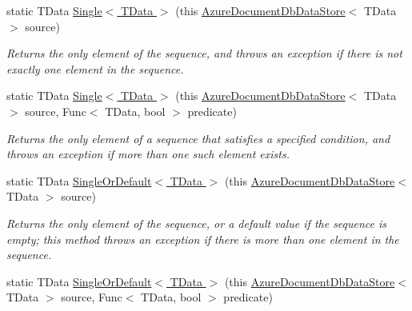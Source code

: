 \begin{DoxyCompactItemize}
\item 
static T\+Data \hyperlink{classSystem_1_1Linq_1_1AzureDocumentDbDataStoreExtensions_a0db5f545a8b606324451bfec69db7862_a0db5f545a8b606324451bfec69db7862}{Single$<$ T\+Data $>$} (this \hyperlink{classCqrs_1_1Azure_1_1DocumentDb_1_1DataStores_1_1AzureDocumentDbDataStore}{Azure\+Document\+Db\+Data\+Store}$<$ T\+Data $>$ source)
\begin{DoxyCompactList}\small\item\em Returns the only element of the sequence, and throws an exception if there is not exactly one element in the sequence. \end{DoxyCompactList}\item 
static T\+Data \hyperlink{classSystem_1_1Linq_1_1AzureDocumentDbDataStoreExtensions_a88615fafe8c7bb0f9a0804eb4e4f0472_a88615fafe8c7bb0f9a0804eb4e4f0472}{Single$<$ T\+Data $>$} (this \hyperlink{classCqrs_1_1Azure_1_1DocumentDb_1_1DataStores_1_1AzureDocumentDbDataStore}{Azure\+Document\+Db\+Data\+Store}$<$ T\+Data $>$ source, Func$<$ T\+Data, bool $>$ predicate)
\begin{DoxyCompactList}\small\item\em Returns the only element of a sequence that satisfies a specified condition, and throws an exception if more than one such element exists. \end{DoxyCompactList}\item 
static T\+Data \hyperlink{classSystem_1_1Linq_1_1AzureDocumentDbDataStoreExtensions_ab0724b844d77e86bee14ce246161b6be_ab0724b844d77e86bee14ce246161b6be}{Single\+Or\+Default$<$ T\+Data $>$} (this \hyperlink{classCqrs_1_1Azure_1_1DocumentDb_1_1DataStores_1_1AzureDocumentDbDataStore}{Azure\+Document\+Db\+Data\+Store}$<$ T\+Data $>$ source)
\begin{DoxyCompactList}\small\item\em Returns the only element of the sequence, or a default value if the sequence is empty; this method throws an exception if there is more than one element in the sequence. \end{DoxyCompactList}\item 
static T\+Data \hyperlink{classSystem_1_1Linq_1_1AzureDocumentDbDataStoreExtensions_a37c11caa4a5e82f4761bf3b910ee0f15_a37c11caa4a5e82f4761bf3b910ee0f15}{Single\+Or\+Default$<$ T\+Data $>$} (this \hyperlink{classCqrs_1_1Azure_1_1DocumentDb_1_1DataStores_1_1AzureDocumentDbDataStore}{Azure\+Document\+Db\+Data\+Store}$<$ T\+Data $>$ source, Func$<$ T\+Data, bool $>$ predicate)

\end{DoxyCompactItemize}
